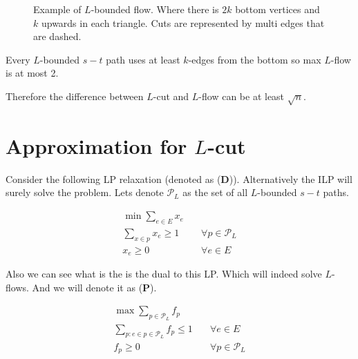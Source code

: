 \begin{figure}[!ht]
	\caption{Example of $L$-bounded flow. Where there is $2k$ bottom vertices and $k$ upwards in each triangle. Cuts are represented by multi edges that are dashed.}
	\label{l-bounded flow}
\end{figure}

\begin{observ}
	Every $L$-bounded $s-t$ path uses at least $k$-edges from the bottom so max $L$-flow is at most 2.
\end{observ}

Therefore the difference between $L$-cut and $L$-flow can be at least $\sqrt{n}$.

\section{Approximation for $L$-cut}

Consider the following LP relaxation (denoted as (\textbf{D})). Alternatively the ILP will surely solve the problem. Lets denote $\mathcal{P}_L$ as the set of all $L$-bounded $s-t$ paths.

$$
\begin{aligned}
	\min \sum_{e \in E} x_e & \\
	\sum_{x \in p} x_e \geq 1 & \quad \forall p \in \mathcal{P}_L \\
	x_e \geq 0 & \quad \forall e \in E
\end{aligned}
$$

Also we can see what is the is the dual to this LP. Which will indeed solve $L$-flows. And we will denote it as (\textbf{P}).

$$
\begin{aligned}
	\max \sum_{p \in \mathcal{P}_L} f_p &\\
	\sum_{p: e \in p \in \mathcal{P}_L} f_p \leq 1 & \quad \forall e \in E\\
	f_p \geq 0 & \quad \forall p \in \mathcal{P}_L
\end{aligned}
$$

